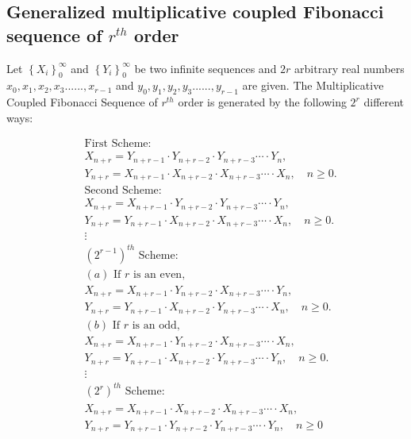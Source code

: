 	\subsection*{Generalized multiplicative coupled Fibonacci  sequence of $r^{th}$  order}
	\begin{definition}
Let $\left\{X_{i}\right\}_{0}^{\infty}$ and $\left\{Y_{i}\right\}_{0}^{\infty}$ be two infinite sequences and $2r$ arbitrary real numbers $x_{0},x_{1},x_{2},x_{3}......,x_{r-1}$ and $y_{0},y_{1},y_{2},y_{3}......,y_{r-1}$ are given. The Multiplicative Coupled Fibonacci  Sequence of $r^{th}$  order is generated by the following $2^{r}$ different ways:
\end{definition}
	\begin{align*}
	 &\text{First Scheme:}\\
	&X_{n+r}=Y_{n+r-1}\cdot Y_{n+r-2}\cdot Y_{n+r-3}\cdots\cdot Y_{n} ,\\&
	Y_{n+r}=X_{n+r-1}\cdot X_{n+r-2}\cdot X_{n+r-3}\cdots\cdot X_{n} , \quad n\geq 0.\\
 &\text{Second Scheme:}\\
	&X_{n+r}=X_{n+r-1}\cdot Y_{n+r-2}\cdot Y_{n+r-3}\cdots\cdot Y_{n} ,\\& Y_{n+r}=Y_{n+r-1}\cdot X_{n+r-2}\cdot X_{n+r-3}\cdots\cdot X_{n}, \quad n\geq 0.\\
	&{\vdots}\\
	&\text{$(2^{r-1})^{th}$ Scheme:}\\
	&	\text{$(a)$ If $r$ is an even,}\\
&	X_{n+r}=X_{n+r-1}\cdot Y_{n+r-2}\cdot X_{n+r-3}\cdots\cdot Y_{n},\\&
	Y_{n+r}=Y_{n+r-1}\cdot X_{n+r-2}\cdot Y_{n+r-3}\cdots\cdot X_{n},\quad n\geq 0.\\
	&\text{$(b)$ If $r$ is an odd,}\\
&	X_{n+r}=X_{n+r-1}\cdot Y_{n+r-2}\cdot X_{n+r-3}\cdots\cdot X_{n}, \\&
	Y_{n+r}=Y_{n+r-1}\cdot X_{n+r-2}\cdot Y_{n+r-3}\cdots\cdot Y_{n},\quad n\geq 0.\\
	&{\vdots}\\
&\text{$(2^{r})^{th}$ Scheme:}\\
	&X_{n+r}=X_{n+r-1}\cdot X_{n+r-2}\cdot X_{n+r-3}\cdots\cdot X_{n},\\&
	Y_{n+r}=Y_{n+r-1}\cdot Y_{n+r-2}\cdot Y_{n+r-3}\cdots\cdot Y_{n},\quad n\geq 0
	\end{align*}
